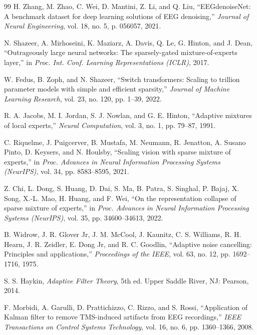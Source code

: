 \documentclass[journal]{IEEEtran}
\begin{document}
\begin{thebibliography}{99}
H. Zhang, M. Zhao, C. Wei, D. Mantini, Z. Li, and Q. Liu, ``EEGdenoiseNet: A benchmark dataset for deep learning solutions of EEG denoising,'' \textit{Journal of Neural Engineering}, vol. 18, no. 5, p. 056057, 2021.

N. Shazeer, A. Mirhoseini, K. Maziarz, A. Davis, Q. Le, G. Hinton, and J. Dean, ``Outrageously large neural networks: The sparsely-gated mixture-of-experts layer,'' in \textit{Proc. Int. Conf. Learning Representations (ICLR)}, 2017.

W. Fedus, B. Zoph, and N. Shazeer, ``Switch transformers: Scaling to trillion parameter models with simple and efficient sparsity,'' \textit{Journal of Machine Learning Research}, vol. 23, no. 120, pp. 1--39, 2022.

R. A. Jacobs, M. I. Jordan, S. J. Nowlan, and G. E. Hinton, ``Adaptive mixtures of local experts,'' \textit{Neural Computation}, vol. 3, no. 1, pp. 79--87, 1991.

C. Riquelme, J. Puigcerver, B. Mustafa, M. Neumann, R. Jenatton, A. Susano Pinto, D. Keysers, and N. Houlsby, ``Scaling vision with sparse mixture of experts,'' in \textit{Proc. Advances in Neural Information Processing Systems (NeurIPS)}, vol. 34, pp. 8583--8595, 2021.

Z. Chi, L. Dong, S. Huang, D. Dai, S. Ma, B. Patra, S. Singhal, P. Bajaj, X. Song, X.-L. Mao, H. Huang, and F. Wei, ``On the representation collapse of sparse mixture of experts,'' in \textit{Proc. Advances in Neural Information Processing Systems (NeurIPS)}, vol. 35, pp. 34600--34613, 2022.

B. Widrow, J. R. Glover Jr, J. M. McCool, J. Kaunitz, C. S. Williams, R. H. Hearn, J. R. Zeidler, E. Dong Jr, and R. C. Goodlin, ``Adaptive noise cancelling: Principles and applications,'' \textit{Proceedings of the IEEE}, vol. 63, no. 12, pp. 1692--1716, 1975.

S. S. Haykin, \textit{Adaptive Filter Theory}, 5th ed. Upper Saddle River, NJ: Pearson, 2014.

F. Morbidi, A. Garulli, D. Prattichizzo, C. Rizzo, and S. Rossi, ``Application of Kalman filter to remove TMS-induced artifacts from EEG recordings,'' \textit{IEEE Transactions on Control Systems Technology}, vol. 16, no. 6, pp. 1360--1366, 2008.


\end{thebibliography}
\end{document}
